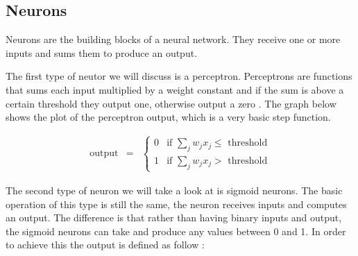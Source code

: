 \documentclass{l4proj}
\begin{document}
\subsection{Neurons} 
Neurons are the building blocks of a neural network. They receive one or more inputs and sums them to produce an output.


The first type of neutor we will discuss is a perceptron. Perceptrons are functions that sums each input multiplied by a weight constant and if the sum is above a certain threshold they output one, otherwise output a zero \cite{intro_book}. The graph below shows the plot of the perceptron output, which is a very basic step function.

\begin{center}
\end{center}

\begin{eqnarray}
  \mbox{output} & = & \left\{ \begin{array}{ll}
      0 & \mbox{if } \sum_j w_j x_j \leq \mbox{ threshold} \\ 
      1 & \mbox{if } \sum_j w_j x_j > \mbox{ threshold}
      \end{array} \right.
\end{eqnarray}

The second type of neuron we will take a look at is sigmoid neurons. The basic operation of this type is still the same, the neuron receives inputs and computes an output. The difference is that rather than having binary inputs and output, the sigmoid neurons can take and produce any values between 0 and 1. In order to achieve this the output is defined as follow \cite{intro_book}:

\begin{center}
\end{center}
\end{document}
